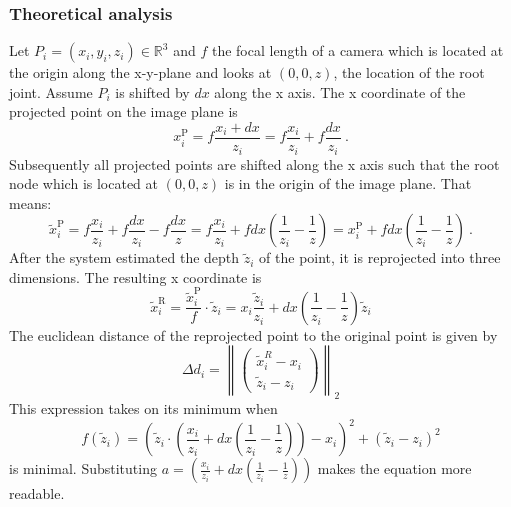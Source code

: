 \documentclass[11pt]{article}
\begin{document}
	\subsubsection{Theoretical analysis}
	Let $P_i=(x_i, y_i, z_i) \in \mathbb{R}^3$ and $f$ the focal length of a camera which is located at the origin along the x-y-plane and looks at $(0, 0, z)$, the location of the root joint. 
	Assume $P_i$ is shifted by $dx$ along the x axis.
	The x coordinate of the projected point on the image plane is
	\begin{equation}
		x_i^\mathrm{P} = f \frac{x_i + dx}{z_i} = f \frac{x_i}{z_i} + f \frac{dx}{z_i}\ .
	\end{equation}
	Subsequently all projected points are shifted along the x axis such that the root node which is located at $(0, 0, z)$ is in the origin of the image plane. That means:
	\begin{equation}
		\widetilde{x}_i^\mathrm{P} = f \frac{x_i}{z_i} + f \frac{dx}{z_i} - f \frac{dx}{z} 
		= f \frac{x_i}{z_i} + f dx (\frac{1}{z_i} - \frac{1}{z})
		= x_i^\mathrm{P} + f dx (\frac{1}{z_i} - \frac{1}{z})\ .
	\end{equation}
	After the system estimated the depth $\widetilde{z}_i$ of the point, it is reprojected into three dimensions. The resulting x coordinate is 
	\begin{equation}
		\widetilde{x}_i^\mathrm{R} = \frac{\widetilde{x}_i^\mathrm{P}}{f} \cdot \widetilde{z}_i
		= x_i \frac{\widetilde{z}_i}{z_i} + dx (\frac{1}{z_i} - \frac{1}{z}) \widetilde{z}_i
	\end{equation}
	The euclidean distance of the reprojected point to the original point is given by
	\begin{equation}
	\label{eq:delta-d}
		\Delta d_i = \left \| 
		\begin{pmatrix}
			\widetilde{x}_i^R - x_i \\
			\widetilde{z}_i - z_i
		\end{pmatrix}
		\right \|_2
	\end{equation}
	This expression takes on its minimum when 
	\begin{equation}
		\label{eq:minimum-distance}
		f(\widetilde{z}_i) = \left ( \widetilde{z}_i \cdot \left( \frac{x_i}{z_i} + dx \left( \frac{1}{z_i} - \frac{1}{z} \right) \right ) - x_i \right)^2 + ( \widetilde{z}_i - z_i ) ^2
	\end{equation}
	is minimal. 
	Substituting $a = \left( \frac{x_i}{z_i} + dx \left( \frac{1}{z_i} - \frac{1}{z} \right) \right )$ makes the equation more readable. 
\end{document}
